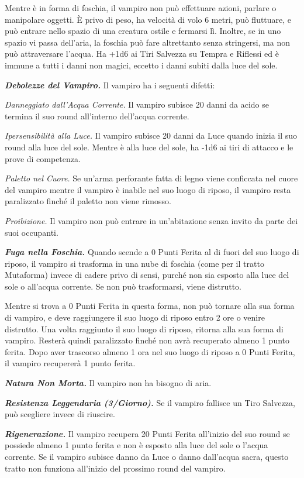 \begin{multicols}{2}
Mentre è in forma di foschia, il vampiro non può effettuare azioni, parlare o manipolare oggetti. È privo di peso, ha velocità di volo 6 metri, può fluttuare, e può entrare nello spazio di una creatura ostile e fermarsi lì. Inoltre, se in uno spazio vi passa dell'aria, la foschia può fare altrettanto senza stringersi, ma non può attraversare l'acqua. Ha +1d6 ai Tiri Salvezza su Tempra e Riflessi ed è immune a tutti i danni non magici, eccetto i danni subiti dalla luce del
sole.

\textit{\textbf{Debolezze del Vampiro.}} Il vampiro ha i seguenti difetti:

\textit{Danneggiato dall'Acqua Corrente.} Il vampiro subisce 20 danni da acido se termina il suo round all'interno dell'acqua corrente.

\textit{Ipersensibilità alla Luce.} Il vampiro subisce 20 danni da Luce quando inizia il suo round alla luce del sole. Mentre è alla luce del sole, ha -1d6 ai tiri di attacco e le prove di competenza.

\textit{Paletto nel Cuore.} Se un'arma perforante fatta di legno viene conficcata nel cuore del vampiro mentre il vampiro è inabile nel suo luogo di riposo, il vampiro resta paralizzato finché il paletto non viene rimosso.

\textit{Proibizione.} Il vampiro non può entrare in un'abitazione senza invito da parte dei suoi occupanti.

\textit{\textbf{Fuga nella Foschia.}} Quando scende a 0 Punti Ferita al di fuori del suo luogo di riposo, il vampiro si trasforma in una nube di foschia (come per il tratto Mutaforma) invece di cadere privo di sensi, purché non sia esposto alla luce del sole o all'acqua corrente. Se non può trasformarsi, viene distrutto.

Mentre si trova a 0 Punti Ferita in questa forma, non può tornare alla sua forma di vampiro, e deve raggiungere il suo luogo di riposo entro 2 ore o venire distrutto. Una volta raggiunto il suo luogo di riposo, ritorna alla sua forma di vampiro. Resterà quindi paralizzato finché non avrà recuperato almeno 1 punto ferita. Dopo aver trascorso almeno 1 ora nel suo luogo di riposo a 0 Punti Ferita, il vampiro recupererà 1 punto ferita.

\textit{\textbf{Natura Non Morta.}} Il vampiro non ha bisogno di aria.

\textit{\textbf{Resistenza Leggendaria (3/Giorno).}} Se il vampiro fallisce un Tiro Salvezza, può scegliere invece di riuscire.

\textit{\textbf{Rigenerazione.}} Il vampiro recupera 20 Punti Ferita all'inizio del suo round se possiede almeno 1 punto ferita e non è esposto alla luce del sole o l'acqua corrente. Se il vampiro subisce danno da Luce o danno dall'acqua sacra, questo tratto non funziona all'inizio del prossimo round del vampiro.


\end{multicols}
